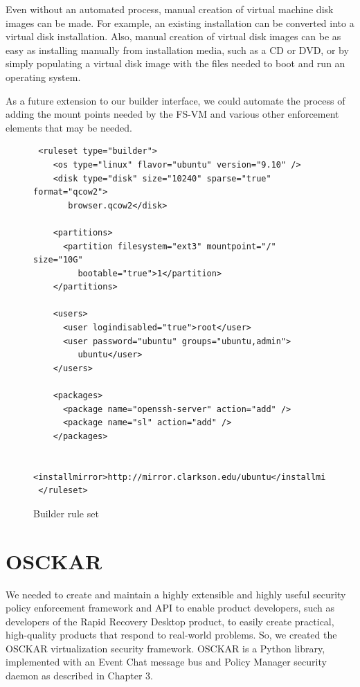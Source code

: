 Even without an automated process, manual creation of virtual machine disk images can be made. For example, an existing installation can be converted into a virtual disk installation. Also, manual creation of virtual disk images can be as easy as installing manually from installation media, such as a CD or DVD, or by simply populating a virtual disk image with the files needed to boot and run an operating system\cite{runningxen_book}.

As a future extension to our builder interface, we could automate the process of adding the mount points needed by the FS-VM and various other enforcement elements that may be needed.

\begin{figure}[tbp]
\caption{Builder rule set}
\label{lst:builder-ruleset}
\begin{lstlisting}
 <ruleset type="builder">
    <os type="linux" flavor="ubuntu" version="9.10" />
    <disk type="disk" size="10240" sparse="true" format="qcow2">
       browser.qcow2</disk>

    <partitions>
      <partition filesystem="ext3" mountpoint="/" size="10G" 
         bootable="true">1</partition>
    </partitions>

    <users>
      <user logindisabled="true">root</user>
      <user password="ubuntu" groups="ubuntu,admin">
         ubuntu</user>
    </users>
    
    <packages>
      <package name="openssh-server" action="add" />
      <package name="sl" action="add" />    
    </packages>

    <installmirror>http://mirror.clarkson.edu/ubuntu</installmirror>
 </ruleset>
\end{lstlisting}
\end{figure}

\section{OSCKAR}

We needed to create and maintain a highly extensible and highly useful security policy
enforcement framework and API to enable product developers, such as developers of the Rapid Recovery Desktop product, to easily create practical, high-quality products that respond to real-world problems. So, we created the OSCKAR virtualization security framework. OSCKAR is a Python library, implemented with an Event Chat message bus and Policy Manager security daemon as described in Chapter 3. 

